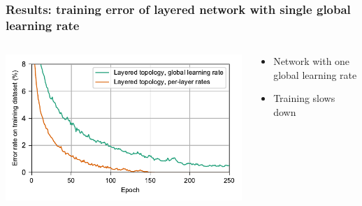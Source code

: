 \documentclass[pdf]{beamer}
\begin{document}
\begin{frame}
	\frametitle{Results: training error of layered network with single global learning rate}
	\begin{columns}
	\begin{column}{.6\textwidth}
		\includegraphics[width=\textwidth]{figures/performance_original+global.pdf}
	\end{column}
	\begin{column}{.4\textwidth}
	\begin{itemize}
		\item<1-> Network with one global learning rate
		\item<2-> Training slows down
	\end{itemize}
	\end{column}
	\end{columns}
\end{frame}
\end{document}
